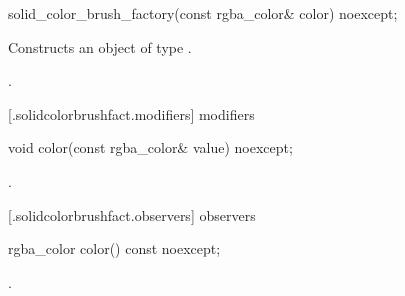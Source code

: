\begin{itemdecl}
    solid_color_brush_factory(const rgba_color& color) noexcept;
\end{itemdecl}
\begin{itemdescr}
	\pnum
	\effects
	Constructs an object of type .
	
	\pnum
	\postcondition
	.
		
\end{itemdescr}

 [\iotwod.solidcolorbrushfact.modifiers] { modifiers}

\begin{itemdecl}
    void color(const rgba_color& value) noexcept;
\end{itemdecl}
\begin{itemdescr}
	\pnum
	\postconditions
	.
	
\end{itemdescr}

 [\iotwod.solidcolorbrushfact.observers] { observers}

\begin{itemdecl}
    rgba_color color() const noexcept;
\end{itemdecl}
\begin{itemdescr}
	\pnum
	\returns
	.

\end{itemdescr}

